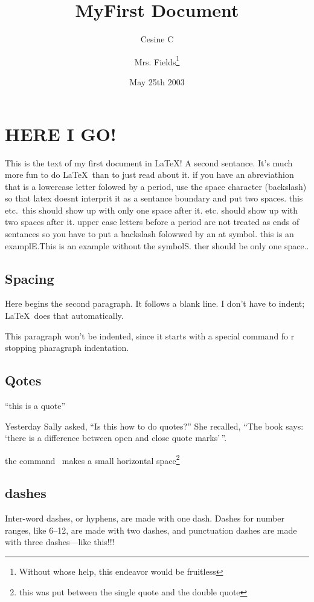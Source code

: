 

\title{MyFirst Document}
\author{Cesine C \and Mrs. Fields\thanks{Without whose help, this endeavor would be fruitless}}
\date{May 25th 2003}%

\maketitle
\tableofcontents
\clearpage %
\chapter {HERE I GO!}
\label{I_Go}

This is the text of my first document in \LaTeX!
A     second     sentance.
It's much more fun to do \LaTeX\ than to
just read about it.
if you have an abreviathion that is a lowercase letter folowed by a period, use the space character (backslash) so that latex doesnt interprit it as a sentance boundary and put two spaces. this  etc.\ this should show up with only one space after it. etc. should show up with two spaces after it. upper case letters before a period are not treated as ends of sentances so you have to put a backslash folowwed by an at symbol. this is an examplE.\@ This is an example without the symbolS. ther should be only one space..
\section{Spacing}
Here begins the second paragraph. It follows a blank line. I don't have to indent; \LaTeX\ does that automatically.

\noindent This paragraph won't be indented, since it starts with a special command fo r stopping pharagraph indentation.
\section{Qotes}
``this is a quote''

Yesterday Sally asked, ``Is this how to do quotes?'' She recalled, ``The book says: `there is a difference between open and close quote marks'\,''.

the command \, makes a small horizontal space\footnote{this was put between the single quote and the double quote}
\section{dashes}
Inter-word dashes, or hyphens, are made with one dash. Dashes for number ranges, like 6--12, are made with two dashes, and punctuation dashes are made with three dashes---like this!!!
